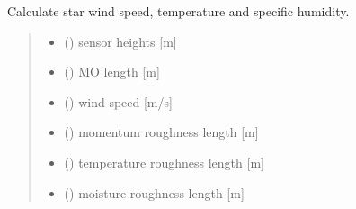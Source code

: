\documentclass[letterpaper,10pt,english]{sphinxmanual}
\begin{document}

\begin{fulllineitems}
\label{\detokenize{users_guide:AirSeaFluxCode.flux_subs.get_strs}}
\pysigstartsignatures
\pysiglinewithargsret
{}
{\sphinxparamcomma {}\sphinxparamcomma {}\sphinxparamcomma {}\sphinxparamcomma {}\sphinxparamcomma {}\sphinxparamcomma {}\sphinxparamcomma {}\sphinxparamcomma {}\sphinxparamcomma {}\sphinxparamcomma {}\sphinxparamcomma {}}
{}
\pysigstopsignatures
\sphinxAtStartPar
Calculate star wind speed, temperature and specific humidity.
\begin{quote}\begin{description}
\begin{itemize}
\item {}
\sphinxAtStartPar
{} () \textendash{} sensor heights {[}m{]}

\item {}
\sphinxAtStartPar
{} () \textendash{} M\sphinxhyphen{}O length     {[}m{]}

\item {}
\sphinxAtStartPar
{} () \textendash{} wind speed     {[}m/s{]}

\item {}
\sphinxAtStartPar
{} () \textendash{} momentum roughness length    {[}m{]}

\item {}
\sphinxAtStartPar
{} () \textendash{} temperature roughness length {[}m{]}

\item {}
\sphinxAtStartPar
{} () \textendash{} moisture roughness length    {[}m{]}


\end{itemize}
\end{description}
\end{quote}
\end{fulllineitems}
\end{document}
